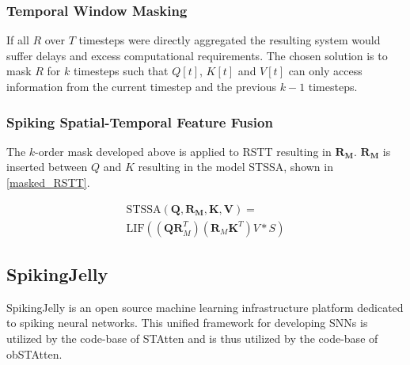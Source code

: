 \documentclass[../main.tex]{subfiles}
\begin{document}
\subsubsection{Temporal Window Masking}
If all $R$ over $T$ timesteps were directly aggregated the resulting system would suffer delays and excess computational requirements\cite{STSSA}. The chosen solution is to mask $R$ for $k$ timesteps such that $Q[t]$, $K[t]$ and $V[t]$ can only access information from the current timestep and the previous $k-1$ timesteps\cite{STSSA}.

\subsubsection{Spiking Spatial-Temporal Feature Fusion}
The $k$-order mask developed above is applied to RSTT resulting in $\mathbf{R_M}$. $\mathbf{R_M}$ is inserted between $Q$ and $K$\cite{STSSA} resulting in the model STSSA, shown in \eqref{masked_RSTT}.

\begin{multline}\label{masked_RSTT}
\text{STSSA}(\mathbf{Q}, \mathbf{R_M}, \textbf{K}, \mathbf{V})=\\ 
\text{LIF}((\mathbf{QR}^T_M)(\mathbf{R}_M\mathbf{K}^T)V*S)
\end{multline}

\subsection{SpikingJelly}
SpikingJelly is an open source machine learning infrastructure platform dedicated to spiking neural networks\cite{spikingjelly}. This unified framework for developing SNNs is utilized by the code-base of STAtten\cite{STAtten} and is thus utilized by the code-base of obSTAtten.
\end{document}
